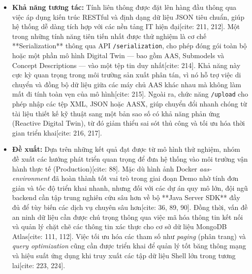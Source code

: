 \documentclass[twocolumn]{article}
\begin{document}
\begin{itemize}
\item \textbf{Khả năng tương tác:} Tính liên thông được đặt lên hàng đầu thông qua việc áp dụng kiến trúc RESTful và định dạng dữ liệu JSON tiêu chuẩn, giúp hệ thống dễ dàng tích hợp với các nền tảng IT hiện đại[cite: 211, 212]. Một trong những tính năng tiên tiến nhất được thử nghiệm là cơ chế **Serialization** thông qua API \texttt{/serialization}, cho phép đóng gói toàn bộ hoặc một phần mô hình Digital Twin — bao gồm AAS, Submodels và Concept Descriptions — vào một tệp tin duy nhất[cite: 214]. Khả năng này cực kỳ quan trọng trong môi trường sản xuất phân tán, vì nó hỗ trợ việc di chuyển và đồng bộ dữ liệu giữa các máy chủ AAS khác nhau mà không làm mất đi tính toàn vẹn của mô hình[cite: 215]. Ngoài ra, chức năng \texttt{/upload} cho phép nhập các tệp XML, JSON hoặc AASX, giúp chuyển đổi nhanh chóng từ tài liệu thiết kế kỹ thuật sang một bản sao số có khả năng phản ứng (Reactive Digital Twin), từ đó giảm thiểu sai sót thủ công và tối ưu hóa thời gian triển khai[cite: 216, 217].

\item \textbf{Đề xuất:} Dựa trên những kết quả đạt được từ mô hình thử nghiệm, nhóm đề xuất các hướng phát triển quan trọng để đưa hệ thống vào môi trường vận hành thực tế (Production)[cite: 88]. Mặc dù hình ảnh Docker \textit{aas-environment} đã hoàn thành tốt vai trò trong giai đoạn Demo nhờ tính đơn giản và tốc độ triển khai nhanh, nhưng đối với các dự án quy mô lớn, đội ngũ backend cần tập trung nghiên cứu sâu hơn về bộ **Java Server SDK** đầy đủ để tùy biến các dịch vụ chuyên sâu hơn[cite: 36, 89, 90]. Đồng thời, vấn đề an ninh dữ liệu cần được chú trọng thông qua việc mã hóa thông tin kết nối và quản lý chặt chẽ các thông tin xác thực cho cơ sở dữ liệu MongoDB Atlas[cite: 111, 112]. Việc tối ưu hóa các tham số như \textit{paging} (phân trang) và \textit{query optimization} cũng cần được triển khai để quản lý tốt băng thông mạng và hiệu suất ứng dụng khi truy xuất các tập dữ liệu Shell lớn trong tương lai[cite: 223, 224].
\end{itemize}

\end{document}
